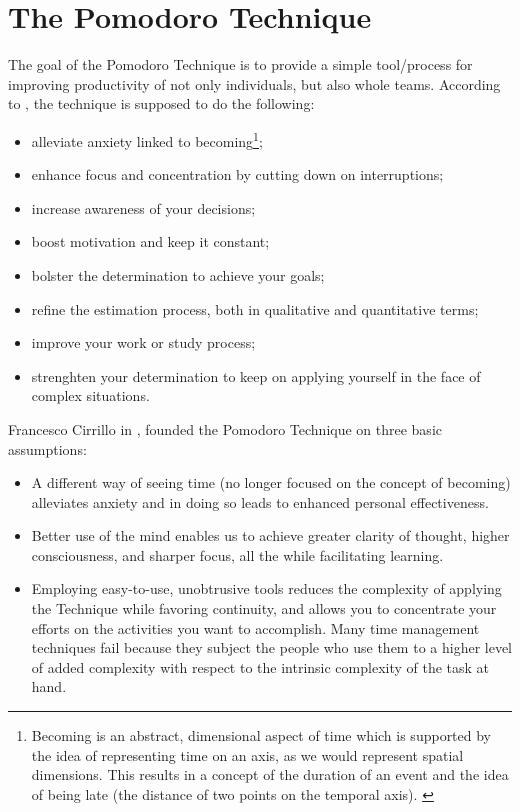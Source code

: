 \documentclass[11pt,singleside]{myfithesis2}
\begin{document}
	\section{The Pomodoro Technique}

The goal of the Pomodoro Technique is to provide a simple tool/process for improving productivity of not only individuals, but also whole teams. According to \cite{pomodoro}, the technique is supposed to do the following:
\begin{itemize}
	\item alleviate anxiety linked to becoming\footnote{Becoming is an abstract, dimensional aspect of time which is supported by the idea of representing time on an axis,  as we would represent spatial dimensions. This results in a concept of the duration of an event and the idea of being late (the distance of two points on the temporal axis). \cite{pomodoro}};
	\item enhance focus and concentration by cutting down on interruptions;
	\item increase awareness of your decisions;
	\item boost motivation and keep it constant;
	\item bolster the determination to achieve your goals;
	\item refine the estimation process, both in qualitative and quantitative terms;
	\item improve your work or study process;
	\item strenghten your determination to keep on applying yourself in the face of complex situations.
\end{itemize}

Francesco Cirrillo in \cite{pomodoro}, founded the Pomodoro Technique on three basic assumptions:
\begin{itemize}
	\item A different way of seeing time (no longer focused on the concept of becoming) alleviates anxiety and in doing so leads to enhanced personal effectiveness. 
	\item Better use of the mind enables us to achieve greater clarity of thought, higher consciousness, and sharper focus, all the while facilitating learning. 
	\item Employing easy-to-use, unobtrusive tools reduces the complexity of applying the Technique while favoring continuity, and allows you to concentrate your efforts on the 	activities you want to accomplish. Many time management techniques fail because they subject the people who use them to a higher level of added complexity with respect to the intrinsic complexity of the task at hand.
\end{itemize}
\end{document}
